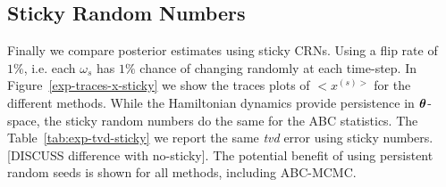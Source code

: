 \documentclass[]{article}
\begin{document}
%
%
% 
%
%

%




\subsection{Sticky Random Numbers}
Finally we compare posterior estimates using sticky CRNs.  Using a flip rate of $1\%$, i.e. each $\omega_s$ has $1\%$ chance of changing randomly at each time-step.  In Figure~\ref{exp-traces-x-sticky} we show the traces plots of $<x^{(s)>}$ for the different methods.  While the Hamiltonian dynamics provide persistence in ${\bm \theta}$-space, the sticky random numbers do the same for the ABC statistics.  The Table~\ref{tab:exp-tvd-sticky} we report the same {\em tvd} error using sticky numbers.  [DISCUSS difference with no-sticky]. The potential benefit of using persistent random seeds is shown for all methods, including ABC-MCMC.
\end{document}
